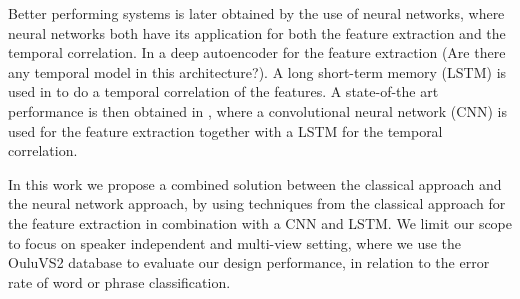 Better performing systems is later obtained by the use of neural networks, where neural networks both have its application for both the feature extraction and the temporal correlation.
In \cite{Ngiam2011} a deep autoencoder for the feature extraction (Are there any temporal model in this architecture?).
A long short-term memory (LSTM) is used in \cite{Wand2016} to do a temporal correlation of the features.
A state-of-the art performance is then obtained in \cite{Lee}, where a convolutional neural network (CNN) is used for the feature extraction together with a LSTM for the temporal correlation.

In this work we propose a combined solution between the classical approach and the neural network approach, by using techniques from the classical approach for the feature extraction in combination with a CNN and LSTM.
We limit our scope to focus on speaker independent and multi-view setting, where we use the OuluVS2 database\cite{Anina2015} to evaluate our design performance, in relation to the error rate of word or phrase classification.

